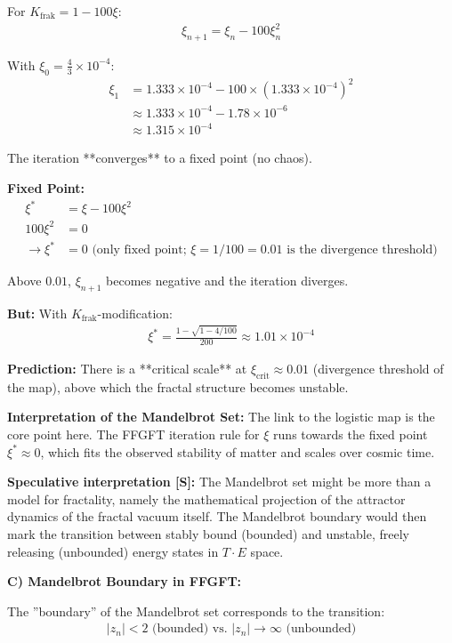 	For $K_{\text{frak}} = 1 - 100\xi$:
	\begin{align*}
		\xi_{n+1} = \xi_n - 100 \xi_n^2
	\end{align*}
	
	With $\xi_0 = \frac{4}{3} \times 10^{-4}$:
	\begin{align*}
		\xi_1 &= 1.333 \times 10^{-4} - 100 \times (1.333 \times 10^{-4})^2 \\
		&\approx 1.333 \times 10^{-4} - 1.78 \times 10^{-6} \\
		&\approx 1.315 \times 10^{-4}
	\end{align*}
	
	The iteration **converges** to a fixed point (no chaos).
	
	\textbf{Fixed Point:}
	\begin{align*}
		\xi^* &= \xi - 100\xi^2 \\
		100\xi^2 &= 0 \\
		\rightarrow \xi^* &= 0 \text{ (only fixed point; } \xi = 1/100 = 0.01 \text{ is the divergence threshold)}
	\end{align*}
	
	Above $0.01$, $\xi_{n+1}$ becomes negative and the iteration diverges.
	
	\textbf{But:} With $K_{\text{frak}}$-modification:
	\begin{align*}
		\xi^* = \frac{1 - \sqrt{1 - 4/100}}{200} \approx 1.01 \times 10^{-4}
	\end{align*}
	
	\textbf{Prediction:} There is a **critical scale** at $\xi_{\text{crit}} \approx 0.01$ (divergence threshold of the map), above which the fractal structure becomes unstable.
	
	\textbf{Interpretation of the Mandelbrot Set:}
	The link to the logistic map is the core point here. The FFGFT iteration rule for $\xi$ runs towards the fixed point $\xi^* \approx 0$, which fits the observed stability of matter and scales over cosmic time.
	
	\textbf{Speculative interpretation [S]:} The Mandelbrot set might be more than a model for fractality, namely the mathematical projection of the attractor dynamics of the fractal vacuum itself. The Mandelbrot boundary would then mark the transition between stably bound (bounded) and unstable, freely releasing (unbounded) energy states in $T \cdot E$ space.
	
	\textbf{C) Mandelbrot Boundary in FFGFT:}
	
	The ''boundary'' of the Mandelbrot set corresponds to the transition:
	\begin{align*}
		|z_n| < 2 \text{ (bounded) vs. } |z_n| \to \infty \text{ (unbounded)}
	\end{align*}
	
